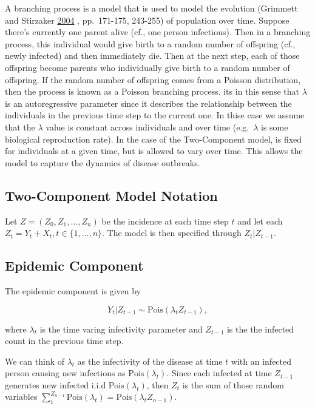 \documentclass[11pt,a4paper]{article}
\numberwithin{equation}{section}
\begin{document}
A branching process is a model that is used to model the evolution
(Grimmett and Stirzaker
\protect\hyperlink{ref-grimmett_probability_2004}{2004} , pp.~171-175,
243-255) of population over time. Suppose there's currently one parent
alive (cf., one person infectious). Then in a branching process, this
individual would give birth to a random number of offspring (cf., newly
infected) and then immediately die. Then at the next step, each of those
offspring become parents who individually give birth to a random number
of offspring. If the random number of offspring comes from a Poisson
distribution, then the process is known as a Poisson branching process.
its in this sense that \(\lambda\) is an autoregressive parameter since
it describes the relationship between the individuals in the previous
time step to the current one. In thise case we assume that the
\(\lambda\) value is constant across individuals and over time
(e.g.~\(\lambda\) is some biological reproduction rate). In the case of
the Two-Component model, is fixed for individuals at a given time, but
is allowed to vary over time. This allows the model to capture the
dynamics of disease outbreaks.

\hypertarget{two-component-model-notation}{%
\subsection{Two-Component Model
Notation}\label{two-component-model-notation}}

Let \(Z = (Z_0, Z_1, ..., Z_n)\) be the incidence at each time step
\(t\) and let each \(Z_t= Y_t + X_t, t\in \{1,\dots, n\}\). The model is
then specified through \(Z_t | Z_{t-1}\).

\hypertarget{epidemic-component}{%
\subsection{Epidemic Component}\label{epidemic-component}}

The epidemic component is given by

\[Y_t|Z_{t-1} \sim\text{Pois}(\lambda_tZ_{t-1}),\]

where \(\lambda_t\) is the time varing infectivity parameter and
\(Z_{t-1}\) is the the infected count in the previous time step.

We can think of \(\lambda_t\) as the infectivity of the disease at time
\(t\) with an infected person causing new infections as
\(\text{Pois}(\lambda_t)\). Since each infected at time \(Z_{t-1}\)
generates new infected i.i.d \(\text{Pois}(\lambda_t)\), then \(Z_t\) is
the sum of those random variables
\(\sum_1^{Z_{n-1}}\text{Pois}(\lambda_t) =\text{Pois}(\lambda_tZ_{n-1})\).
\end{document}
